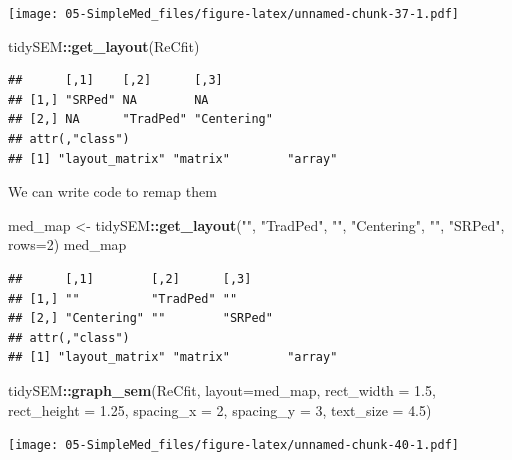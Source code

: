 \documentclass[
  11pt,
]{book}
\newenvironment{Shaded}{\begin{snugshade}}{\end{snugshade}}
\newcommand{\AttributeTok}[1]{\textcolor[rgb]{0.27,0.27,0.27}{#1}}
\newcommand{\DecValTok}[1]{\textcolor[rgb]{0.06,0.06,0.06}{#1}}
\newcommand{\FloatTok}[1]{\textcolor[rgb]{0.06,0.06,0.06}{#1}}
\newcommand{\FunctionTok}[1]{\textcolor[rgb]{0.27,0.27,0.27}{\textbf{#1}}}
\newcommand{\NormalTok}[1]{#1}
\newcommand{\OtherTok}[1]{\textcolor[rgb]{0.37,0.37,0.37}{#1}}
\newcommand{\SpecialCharTok}[1]{\textcolor[rgb]{0.43,0.43,0.43}{\textbf{#1}}}
\newcommand{\StringTok}[1]{\textcolor[rgb]{0.5,0.5,0.5}{#1}}
\begin{document}
\texttt{[image: 05-SimpleMed\_files/figure-latex/unnamed-chunk-37-1.pdf]}

\begin{Shaded}
\begin{Highlighting}[]
\NormalTok{tidySEM}\SpecialCharTok{::}\FunctionTok{get\_layout}\NormalTok{(ReCfit)}
\end{Highlighting}
\end{Shaded}

\begin{verbatim}
##      [,1]    [,2]      [,3]       
## [1,] "SRPed" NA        NA         
## [2,] NA      "TradPed" "Centering"
## attr(,"class")
## [1] "layout_matrix" "matrix"        "array"
\end{verbatim}

We can write code to remap them

\begin{Shaded}
\begin{Highlighting}[]
\NormalTok{med\_map }\OtherTok{\textless{}{-}}\NormalTok{ tidySEM}\SpecialCharTok{::}\FunctionTok{get\_layout}\NormalTok{(}\StringTok{""}\NormalTok{, }\StringTok{"TradPed"}\NormalTok{, }\StringTok{""}\NormalTok{,}
                               \StringTok{"Centering"}\NormalTok{, }\StringTok{""}\NormalTok{, }\StringTok{"SRPed"}\NormalTok{, }\AttributeTok{rows=}\DecValTok{2}\NormalTok{)}
\NormalTok{med\_map}
\end{Highlighting}
\end{Shaded}

\begin{verbatim}
##      [,1]        [,2]      [,3]   
## [1,] ""          "TradPed" ""     
## [2,] "Centering" ""        "SRPed"
## attr(,"class")
## [1] "layout_matrix" "matrix"        "array"
\end{verbatim}

\begin{Shaded}
\begin{Highlighting}[]
\NormalTok{tidySEM}\SpecialCharTok{::}\FunctionTok{graph\_sem}\NormalTok{(ReCfit, }\AttributeTok{layout=}\NormalTok{med\_map,  }\AttributeTok{rect\_width =} \FloatTok{1.5}\NormalTok{, }\AttributeTok{rect\_height =} \FloatTok{1.25}\NormalTok{, }\AttributeTok{spacing\_x =} \DecValTok{2}\NormalTok{, }\AttributeTok{spacing\_y =} \DecValTok{3}\NormalTok{, }\AttributeTok{text\_size =} \FloatTok{4.5}\NormalTok{)}
\end{Highlighting}
\end{Shaded}

\texttt{[image: 05-SimpleMed\_files/figure-latex/unnamed-chunk-40-1.pdf]}
\end{document}
